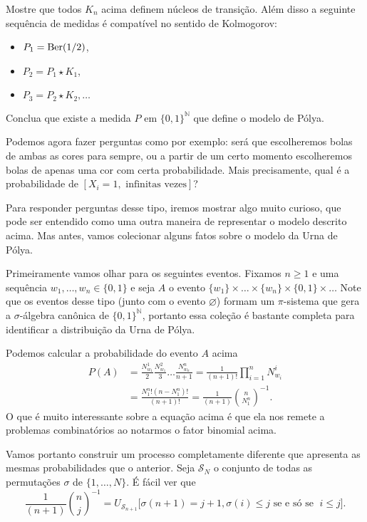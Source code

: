 \begin{topics}
\begin{exercise}
  \label{x:constr_Polya}
  Mostre que todos $K_n$ acima definem núcleos de transição.
  Além disso a seguinte sequência de medidas é compatível no sentido de Kolmogorov:
  \begin{itemize}
  \item $P_1 = \operatorname{Ber}(1/2)$,
  \item $P_2 = P_1 \star K_1$,
  \item $P_3 = P_2 \star K_2, \dots$
  \end{itemize}
  Conclua que existe a medida $P$ em $\{0,1\}^\mathbb{N}$ que define o modelo de Pólya.
\end{exercise}

Podemos agora fazer perguntas como por exemplo: será que escolheremos bolas de ambas as cores para sempre, ou a partir de um certo momento escolheremos bolas de apenas uma cor com certa probabilidade.
Mais precisamente, qual é a probabilidade de $[X_i = 1, \text{ infinitas vezes}]$?


Para responder perguntas desse tipo, iremos mostrar algo muito curioso, que pode ser entendido como uma outra maneira de representar o modelo descrito acima.
Mas antes, vamos colecionar alguns fatos sobre o modelo da Urna de Pólya.

Primeiramente vamos olhar para os seguintes eventos.
Fixamos $n \geq 1$ e uma sequência $w_1, \dots, w_n \in \{0,1\}$ e seja $A$ o evento $\{w_1\} \times \dots \times \{w_n\} \times \{0,1\} \times \dots$
Note que os eventos desse tipo (junto com o evento $\varnothing$) formam um $\pi$-sistema que gera a $\sigma$-álgebra canônica de $\{0,1\}^\mathbb{N}$, portanto essa coleção é bastante completa para identificar a distribuição da Urna de Pólya.

Podemos calcular a probabilidade do evento $A$ acima
\begin{equation}
  \begin{split}
    P(A) & = \frac{N^1_{w_1}}2 \frac{N^2_{w_1}}3 \dots \frac{N^n_{w_n}}{n+1} = \frac{1}{(n+1)!} \prod_{i=1}^n N^i_{w_i}\\
    & = \frac{N^n_1! (n - N^n_1)!}{(n+1)!} = \frac{1}{(n+1)} \binom{n}{N^n_1}^{-1}.
  \end{split}
\end{equation}
O que é muito interessante sobre a equação acima é que ela nos remete a problemas combinatórios ao notarmos o fator binomial acima.

Vamos portanto construir um processo completamente diferente que apresenta as mesmas probabilidades que o anterior.
Seja $\mathcal{S}_N$ o conjunto de todas as permutações $\sigma$ de $\{1,\dots,N\}$.
É fácil ver que
\begin{equation*}
  \frac{1}{(n+1)} \binom{n}{j}^{-1} = U_{\mathcal{S}_{n+1}} \Big[ \sigma(n+1) =j+1, \sigma(i) \leq j \text{ se e só se } \; i \leq j \Big].
\end{equation*}


\end{topics}
